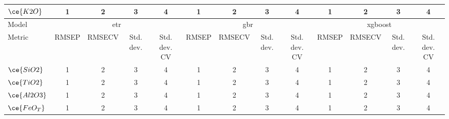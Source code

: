 \begin{table*}[]
{\begin{tabular}{l|cccc|cccc|cccc}
$\ce{K2O}$   & \multicolumn{1}{c}{1}     & \multicolumn{1}{c}{2}           & \multicolumn{1}{c}{3}       & \multicolumn{1}{c|}{4}            & \multicolumn{1}{c}{1}     & \multicolumn{1}{c}{2}           & \multicolumn{1}{c}{3}       & \multicolumn{1}{c|}{4}            & \multicolumn{1}{c}{1}     & \multicolumn{1}{c}{2}           & \multicolumn{1}{c}{3}       & 4                             \\
\hline
Model        & \multicolumn{4}{c|}{\gls{etr}} & \multicolumn{4}{c|}{\gls{gbr}} & \multicolumn{4}{c}{\gls{xgboost}} \\
Metric       & \multicolumn{1}{c}{RMSEP} & \multicolumn{1}{c}{RMSECV} & \multicolumn{1}{c}{Std. dev.} & \multicolumn{1}{c|}{Std. dev. CV} & \multicolumn{1}{c}{RMSEP} & \multicolumn{1}{c}{RMSECV} & \multicolumn{1}{c}{Std. dev.} & \multicolumn{1}{c|}{Std. dev. CV} & \multicolumn{1}{c}{RMSEP} & \multicolumn{1}{c}{RMSECV} & \multicolumn{1}{c}{Std. dev.} & \multicolumn{1}{c}{Std. dev. CV} \\
\hline
$\ce{SiO2}$  & \multicolumn{1}{c}{1}     & \multicolumn{1}{c}{2}           & \multicolumn{1}{c}{3}       & \multicolumn{1}{c|}{4}            & \multicolumn{1}{c}{1}     & \multicolumn{1}{c}{2}           & \multicolumn{1}{c}{3}       & \multicolumn{1}{c|}{4}            & \multicolumn{1}{c}{1}     & \multicolumn{1}{c}{2}           & \multicolumn{1}{c}{3}       & 4                             \\
$\ce{TiO2}$  & \multicolumn{1}{c}{1}     & \multicolumn{1}{c}{2}           & \multicolumn{1}{c}{3}       & \multicolumn{1}{c|}{4}            & \multicolumn{1}{c}{1}     & \multicolumn{1}{c}{2}           & \multicolumn{1}{c}{3}       & \multicolumn{1}{c|}{4}            & \multicolumn{1}{c}{1}     & \multicolumn{1}{c}{2}           & \multicolumn{1}{c}{3}       & 4                             \\
$\ce{Al2O3}$ & \multicolumn{1}{c}{1}     & \multicolumn{1}{c}{2}           & \multicolumn{1}{c}{3}       & \multicolumn{1}{c|}{4}            & \multicolumn{1}{c}{1}     & \multicolumn{1}{c}{2}           & \multicolumn{1}{c}{3}       & \multicolumn{1}{c|}{4}            & \multicolumn{1}{c}{1}     & \multicolumn{1}{c}{2}           & \multicolumn{1}{c}{3}       & 4                             \\
$\ce{FeO_T}$ & \multicolumn{1}{c}{1}     & \multicolumn{1}{c}{2}           & \multicolumn{1}{c}{3}       & \multicolumn{1}{c|}{4}            & \multicolumn{1}{c}{1}     & \multicolumn{1}{c}{2}           & \multicolumn{1}{c}{3}       & \multicolumn{1}{c|}{4}            & \multicolumn{1}{c}{1}     & \multicolumn{1}{c}{2}           & \multicolumn{1}{c}{3}       & 4                             \\

\end{tabular}}
\end{table*}
